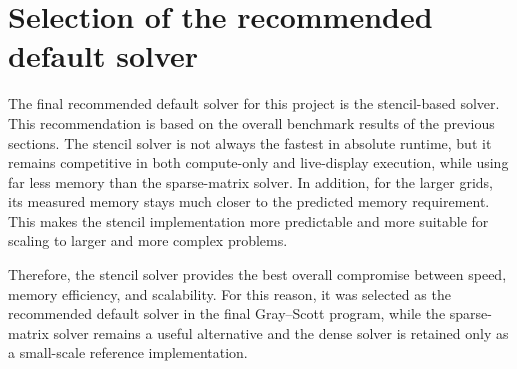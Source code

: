 \section{Selection of the recommended default solver}

The final recommended default solver for this project is the stencil-based solver. This recommendation is based on the overall benchmark results of the previous sections. The stencil solver is not always the fastest in absolute runtime, but it remains competitive in both compute-only and live-display execution, while using far less memory than the sparse-matrix solver. In addition, for the larger grids, its measured memory stays much closer to the predicted memory requirement. This makes the stencil implementation more predictable and more suitable for scaling to larger and more complex problems.

Therefore, the stencil solver provides the best overall compromise between speed, memory efficiency, and scalability. For this reason, it was selected as the recommended default solver in the final Gray--Scott program, while the sparse-matrix solver remains a useful alternative and the dense solver is retained only as a small-scale reference implementation.

